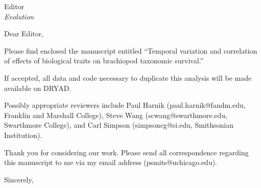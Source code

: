 \documentclass{letter}
\begin{document}
\begin{letter}{Editor \\ \textit{Evolution}}
  \opening{Dear Editor,}

  Please find enclosed the manuscript entitled ``Temporal variation and correlation of effects of biological traits on brachiopod taxonomic survival.''
  
  If accepted, all data and code necessary to duplicate this analysis will be made available on DRYAD.

  Possibly appropriate reviewers include Paul Harnik (paul.harnik@fandm.edu, Franklin and Marshall College), Steve Wang (scwang@swarthmore.edu, Swarthmore College), and Carl Simpson (simpsoncg@si.edu, Smithsonian Institution).
  
  Thank you for considering our work. Please send all correspondence regarding this manuscript to me via my email address (psmits@uchicago.edu).

  \closing{Sincerely,}


\end{letter}
\end{document}
